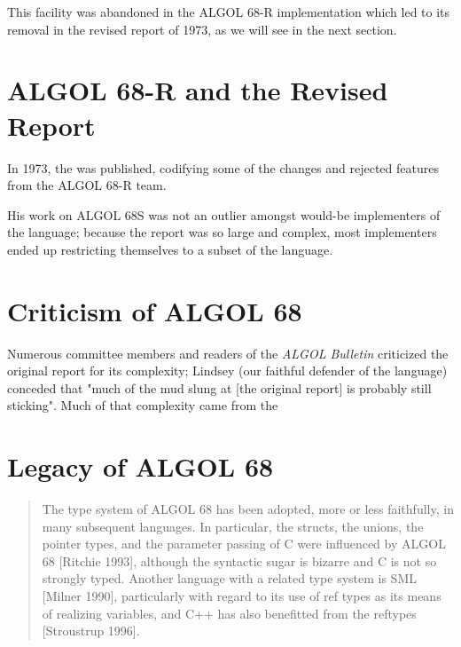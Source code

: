 This facility was abandoned in the ALGOL 68-R implementation which
led to its removal in the revised report of 1973,
as we will see in the next section.

\section{ALGOL 68-R and the Revised Report}

In 1973, the  was published,
codifying some of the changes and rejected features from the ALGOL 68-R team.


His work on ALGOL 68S was not an outlier amongst would-be implementers of the
language; because the report was so large and complex, most
implementers ended up restricting themselves to a subset of the language.

\section{Criticism of ALGOL 68}

Numerous committee members and readers of the \textit{ALGOL Bulletin} criticized
the original report for its complexity; Lindsey (our faithful defender of the
language) conceded that "much of the mud slung at [the original report] is
probably still sticking"\cite{a_history_of_algol_68_1993}.
Much of that complexity came from the 



\section{Legacy of ALGOL 68}

\begin{quotation}
The type system of ALGOL 68 has been adopted, more or less faithfully, in many subsequent
languages. In particular, the structs, the unions, the pointer types, and the parameter passing of C
were influenced by ALGOL 68 [Ritchie 1993], although the syntactic sugar is bizarre and C is not so
strongly typed. Another language with a related type system is SML [Milner 1990], particularly with
regard to its use of ref types as its means of realizing variables, and C++ has also benefitted from the
reftypes [Stroustrup 1996].
\end{quotation}

